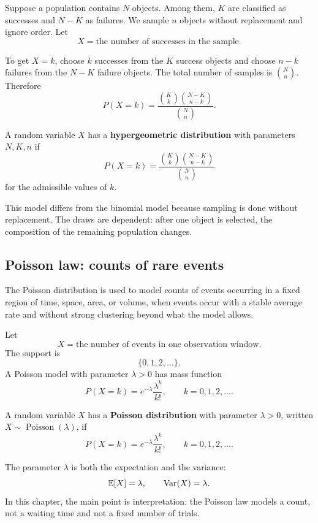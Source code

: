 Suppose a population contains \(N\) objects. Among them, \(K\) are classified as
successes and \(N-K\) as failures. We sample \(n\) objects without replacement and
ignore order. Let
\[
X=\text{the number of successes in the sample}.
\]

To get \(X=k\), choose \(k\) successes from the \(K\) success objects and choose
\(n-k\) failures from the \(N-K\) failure objects. The total number of samples is
\(\binom Nn\). Therefore
\[
P(X=k)=\frac{\binom Kk\binom{N-K}{n-k}}{\binom Nn}.
\]

\begin{definitionbox}
A random variable \(X\) has a \textbf{hypergeometric distribution} with
parameters \(N,K,n\) if
\[
P(X=k)=\frac{\binom Kk\binom{N-K}{n-k}}{\binom Nn}
\]
for the admissible values of \(k\).
\end{definitionbox}

This model differs from the binomial model because sampling is done without
replacement. The draws are dependent: after one object is selected, the
composition of the remaining population changes.

\subsection*{Poisson law: counts of rare events}

The Poisson distribution is used to model counts of events occurring in a fixed
region of time, space, area, or volume, when events occur with a stable average
rate and without strong clustering beyond what the model allows.

Let
\[
X=\text{the number of events in one observation window}.
\]
The support is
\[
\{0,1,2,\ldots\}.
\]
A Poisson model with parameter \(\lambda>0\) has mass function
\[
P(X=k)=e^{-\lambda}\frac{\lambda^k}{k!},\qquad k=0,1,2,\ldots.
\]

\begin{definitionbox}
A random variable \(X\) has a \textbf{Poisson distribution} with parameter
\(\lambda>0\), written \(X\sim\operatorname{Poisson}(\lambda)\), if
\[
P(X=k)=e^{-\lambda}\frac{\lambda^k}{k!},\qquad k=0,1,2,\ldots.
\]
\end{definitionbox}

The parameter \(\lambda\) is both the expectation and the variance:
\[
\mathbb{E}[X]=\lambda,\qquad \operatorname{Var}(X)=\lambda.
\]
In this chapter, the main point is interpretation: the Poisson law models a
count, not a waiting time and not a fixed number of trials.

